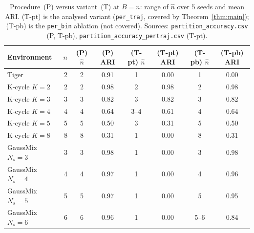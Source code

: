\documentclass[10pt]{article}
\begin{document}
\begin{table}[t]
\centering
\small
\caption{Procedure~(P) versus variant~(T) at $B=n$: range of $\hat n$ over 5 seeds and
  mean ARI.  (T-pt) is the analysed variant (\texttt{per\_traj}, covered by
  Theorem~\ref{thm:main}); (T-pb) is the \texttt{per\_bin} ablation (not covered).
  Sources: \texttt{partition\_accuracy.csv} (P, T-pb),
  \texttt{partition\_accuracy\_pertraj.csv} (T-pt).}
\label{tab:variantT}
\begin{tabular}{lrcccccc}
\toprule
Environment & $n$ & (P) $\hat n$ & (P) ARI & (T-pt) $\hat n$ & (T-pt) ARI & (T-pb) $\hat n$ & (T-pb) ARI \\
\midrule
Tiger & 2 & 2 & 0.91 & 1 & 0.00 & 1 & 0.00 \\
K-cycle $K{=}2$ & 2 & 2 & 0.98 & 2 & 0.98 & 2 & 0.98 \\
K-cycle $K{=}3$ & 3 & 3 & 0.82 & 3 & 0.82 & 3 & 0.82 \\
K-cycle $K{=}4$ & 4 & 4 & 0.64 & 3--4 & 0.61 & 4 & 0.64 \\
K-cycle $K{=}5$ & 5 & 5 & 0.50 & 3 & 0.31 & 5 & 0.50 \\
K-cycle $K{=}8$ & 8 & 8 & 0.31 & 1 & 0.00 & 8 & 0.31 \\
GaussMix $N_s{=}3$ & 3 & 3 & 0.98 & 1 & 0.00 & 3 & 0.98 \\
GaussMix $N_s{=}4$ & 4 & 4 & 0.97 & 1 & 0.00 & 4 & 0.96 \\
GaussMix $N_s{=}5$ & 5 & 5 & 0.97 & 1 & 0.00 & 5 & 0.95 \\
GaussMix $N_s{=}6$ & 6 & 6 & 0.96 & 1 & 0.00 & 5--6 & 0.84 \\
\bottomrule
\end{tabular}
\end{table}
\end{document}
